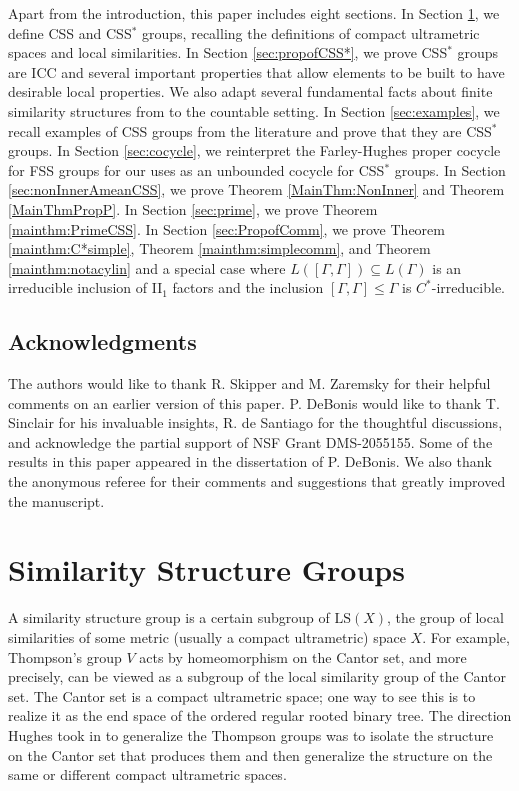 \documentclass[12pt]{amsart}
\numberwithin{equation}{subsection}
\theoremstyle{definition}
\theoremstyle{definition}
\theoremstyle{remark}
\begin{document}
Apart from the introduction, this paper includes eight sections. In Section \ref{sec:simgroups}, we define CSS and CSS$^*$ groups, recalling the definitions of compact ultrametric spaces and local similarities. In Section \ref{sec:propofCSS*}, we prove CSS$^*$ groups are ICC and several important properties that allow elements to be built to have desirable local properties. We also adapt several fundamental facts about finite similarity structures from \cite{hughes2009} to the countable setting. In Section \ref{sec:examples}, we recall examples of CSS groups from the literature and prove that they are CSS$^*$ groups. In Section \ref{sec:cocycle}, we reinterpret the Farley-Hughes proper cocycle for FSS groups for our uses as an unbounded cocycle for CSS$^*$ groups. In Section \ref{sec:nonInnerAmeanCSS}, we prove Theorem \ref{MainThm:NonInner} and Theorem \ref{MainThmPropP}. In Section \ref{sec:prime}, we prove Theorem \ref{mainthm:PrimeCSS}. In Section \ref{sec:PropofComm}, we prove Theorem \ref{mainthm:C*simple}, Theorem \ref{mainthm:simplecomm}, and Theorem \ref{mainthm:notacylin} and a special case where $L([\Gamma,\Gamma]) \subseteq L(\Gamma)$ is an irreducible inclusion of II$_1$ factors and the inclusion $[\Gamma,\Gamma] \le \Gamma$ is $C^*$-irreducible. 




\subsection*{Acknowledgments} 
The authors would like to thank R. Skipper and M. Zaremsky for their helpful comments on an earlier version of this paper. P. DeBonis would like to thank T. Sinclair for his invaluable insights, R. de Santiago for the thoughtful discussions, and acknowledge the partial support of NSF Grant DMS-2055155. Some of the results in this paper appeared in the dissertation of P. DeBonis. We also thank the
anonymous referee for their comments and suggestions that greatly improved the
manuscript.






\section{Similarity Structure Groups}\label{sec:simgroups}

A similarity structure group is a certain subgroup of $\text{LS}(X)$, the group of local similarities of some metric (usually a compact ultrametric) space $X$. For example, Thompson's group $V$ acts by homeomorphism on the Cantor set, and more precisely, can be viewed as a subgroup of the local similarity group of the Cantor set. The Cantor set is a compact ultrametric space; one way to see this is to realize it as the end space of the ordered regular rooted binary tree. The direction Hughes took in \cite{hughes2009} to generalize the Thompson groups was to isolate the structure on the Cantor set that produces them and then generalize the structure on the same or different compact ultrametric spaces. 
\end{document}

